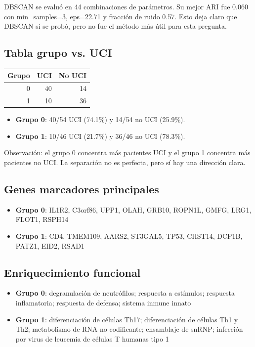 \documentclass[11pt]{article}
\begin{document}
DBSCAN se evaluó en 44 combinaciones de parámetros. Su mejor ARI fue 0.060 con min\_samples=3, eps=22.71 y fracción de ruido 0.57. Esto deja claro que DBSCAN sí se probó, pero no
fue el método más útil para esta pregunta.

\subsection*{Tabla grupo vs. UCI}
\begin{center}
\begin{tabular}{r r r}
\hline
Grupo & UCI & No UCI \\
\hline
0 & 40 & 14 \\
1 & 10 & 36 \\
\hline
\end{tabular}
\end{center}

\begin{itemize}
\item \textbf{Grupo 0}: 40/54 UCI (74.1\%) y 14/54 no UCI (25.9\%).
\item \textbf{Grupo 1}: 10/46 UCI (21.7\%) y 36/46 no UCI (78.3\%).
\end{itemize}

Observación: el grupo 0 concentra más pacientes UCI y el grupo 1 concentra más
pacientes no UCI. La separación no es perfecta, pero sí hay una dirección clara.

\subsection*{Genes marcadores principales}
\begin{itemize}
\item \textbf{Grupo 0}: IL1R2, C3orf86, UPP1, OLAH, GRB10, ROPN1L, GMFG, LRG1, FLOT1, RSPH14
\item \textbf{Grupo 1}: CD4, TMEM109, AARS2, ST3GAL5, TP53, CHST14, DCP1B, PATZ1, EID2, RSAD1
\end{itemize}

\subsection*{Enriquecimiento funcional}
\begin{itemize}
\item \textbf{Grupo 0}: degranulación de neutrófilos; respuesta a estímulos; respuesta inflamatoria; respuesta de defensa; sistema inmune innato
\item \textbf{Grupo 1}: diferenciación de células Th17; diferenciación de células Th1 y Th2; metabolismo de RNA no codificante; ensamblaje de snRNP; infección por virus de leucemia de células T humanas tipo 1
\end{itemize}
\end{document}
